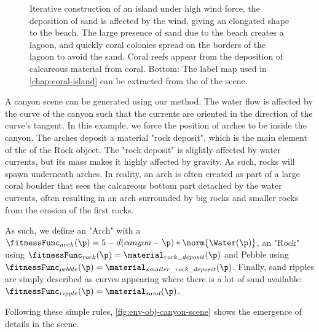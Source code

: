 \begin{figure}
\caption{Iterative construction of an island under high wind force, the deposition of sand is affected by the wind, giving an elongated shape to the beach. The large presence of sand due to the beach creates a lagoon, and quickly coral colonies spread on the borders of the lagoon to avoid the sand. Coral reefs appear from the deposition of calcareous material from coral. Bottom: The label map used in \cref{chap:coral-island} can be extracted from the  of the scene.}
\label{fig:env-obj-iterative-island}
\end{figure}

A canyon scene can be generated using our method. The water flow is affected by the curve of the canyon such that the currents are oriented in the direction of the curve's tangent. In this example, we force the position of arches to be inside the canyon. The arches deposit a material "rock deposit", which is the main element of the  of the Rock object. The "rock deposit" is slightly affected by water currents, but its mass makes it highly affected by gravity. As such, rocks will spawn underneath arches. In reality, an arch is often created as part of a large coral boulder that sees the calcareous bottom part detached by the water currents, often resulting in an arch surrounded by big rocks and smaller rocks from the erosion of the first rocks.

As such, we define an  "Arch" with a  $\fitnessFunc_{arch}(\p) = 5 - d(canyon - \p) * \norm{\Water(\p)}$, an  "Rock" using $\fitnessFunc_{rock}(\p) = \material_{rock\_deposit}(\p)$ and Pebble using $\fitnessFunc_{pebble}(\p) = \material_{smaller\_rock\_deposit}(\p)$. Finally, sand ripples are simply described as curves appearing where there is a lot of sand available: $\fitnessFunc_{ripple}(\p) = \material_{sand}(\p)$.

Following these simple rules, \cref{fig:env-obj-canyon-scene} shows the emergence of details in the scene.

